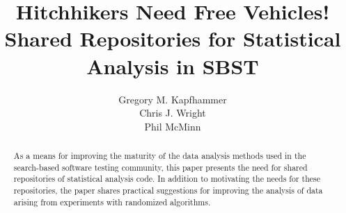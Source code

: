 \documentclass{sig-alternate}
\begin{document}


\title{Hitchhikers Need Free Vehicles! \\ Shared Repositories for Statistical Analysis in SBST \vspace*{-.05in}}


\author{
\alignauthor
Gregory M. Kapfhammer\\
\alignauthor
Chris J. Wright\\
\alignauthor
Phil McMinn\\
}

\maketitle

\begin{abstract}
  As a means for improving the maturity of the data analysis methods used in the search-based software testing
  community, this paper presents the need for shared repositories of statistical analysis code. In addition to
  motivating the needs for these repositories, the paper shares practical suggestions for improving the analysis of data
  arising from experiments with randomized algorithms.
\end{abstract}






\vspace*{-.5em}

\scriptsize


\end{document}
